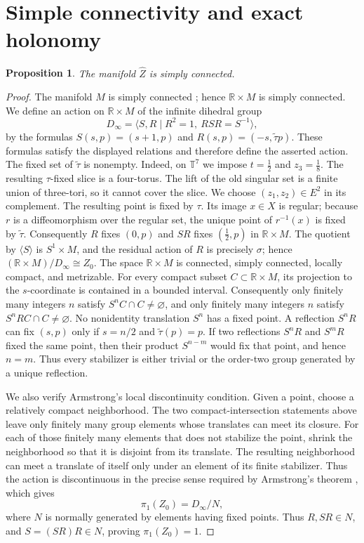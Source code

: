 \documentclass[11pt]{article}
\newtheorem{proposition}[theorem]{Proposition}
\theoremstyle{remark}\newtheorem{remark}[theorem]{Remark}
\newcommand{\T}{\mathbb T}
\newcommand{\R}{\mathbb R}
\begin{document}
\section{Simple connectivity and exact holonomy}
\begin{proposition}\label{prop:pi1}
The manifold $\widehat Z$ is simply connected.
\end{proposition}
\begin{proof}
The manifold $M$ is simply connected \cite[Section 2.2]{MM}; hence
$\R\times M$ is simply connected.  We define an action on $\R\times M$
of the infinite dihedral group
\begin{equation}\label{eq:Dinf}
D_\infty=\langle S,R\mid R^2=1,\ RSR=S^{-1}\rangle,
\end{equation}
by the formulas $S(s,p)=(s+1,p)$ and
$R(s,p)=(-s,\widetilde\tau p)$.  These formulas satisfy the displayed
relations and therefore define the asserted action.  The fixed set of
$\widetilde\tau$ is nonempty.  Indeed, on $\T^7$ we impose
$t=\frac12$ and $z_3=\frac18$.  The resulting
$\tau$-fixed slice is a four-torus.  The lift of the old singular set is a
finite union of three-tori, so it cannot cover the slice.  We choose
$(z_1,z_2)\in E^2$ in its complement.  The resulting point is fixed by $\tau$.  Its
image $x\in X$ is regular; because $r$ is a diffeomorphism over the regular
set, the unique point of $r^{-1}(x)$ is fixed by $\widetilde\tau$.
Consequently $R$ fixes $(0,p)$ and $SR$ fixes $(\frac12,p)$ in
$\R\times M$.  The quotient by $\langle S\rangle$ is $S^1\times M$, and
the residual action of $R$ is precisely $\sigma$; hence
$(\R\times M)/D_\infty\cong Z_0$.  The space $\R\times M$ is connected,
simply connected, locally compact, and metrizable.  For every compact
subset $C\subset\R\times M$, its projection to the $s$-coordinate is
contained in a bounded interval.  Consequently only finitely many
integers $n$ satisfy $S^nC\cap C\ne\varnothing$, and only finitely many
integers $n$ satisfy $S^nRC\cap C\ne\varnothing$.
No nonidentity translation $S^n$ has a fixed point.  A reflection
$S^nR$ can fix $(s,p)$ only if $s=n/2$ and
$\widetilde\tau(p)=p$.  If two reflections $S^nR$ and $S^mR$ fixed the
same point, then their product $S^{n-m}$ would fix that point, and hence
$n=m$.  Thus every stabilizer is either trivial or the order-two group
generated by a unique reflection.

We also verify Armstrong's local discontinuity condition.  Given a point,
choose a relatively compact neighborhood.  The two compact-intersection
statements above leave only finitely many group elements whose translates
can meet its closure.  For each of those finitely many elements that does
not stabilize the point, shrink the neighborhood so that it is disjoint
from its translate.  The resulting neighborhood can meet a translate of
itself only under an element of its finite stabilizer.  Thus the action is
discontinuous in the precise sense required by
Armstrong's theorem \cite{Armstrong}, which gives
\[
\pi_1(Z_0)=D_\infty/N,
\]
where $N$ is normally generated by elements having fixed points.
Thus $R,SR\in N$, and $S=(SR)R\in N$, proving $\pi_1(Z_0)=1$.


\end{proof}
\end{document}
